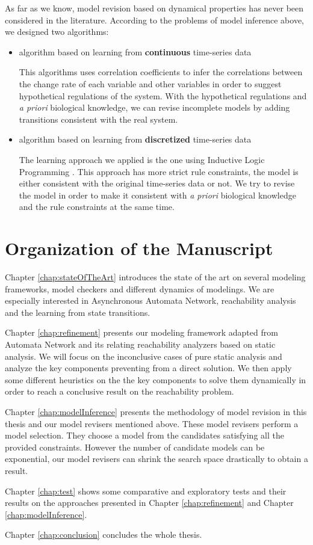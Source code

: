 As far as we know, model revision based on dynamical properties has never been considered in the literature.
According to the problems of model inference above, we designed two algorithms:
\begin{itemize}
    \item algorithm based on learning from \textbf{continuous} time-series data
    
    This algorithms uses correlation coefficients to infer the correlations between the change rate of each variable and other variables in order to suggest hypothetical regulations of the system.
    With the hypothetical regulations and \textit{a priori} biological knowledge, we can revise incomplete models by adding transitions consistent with the real system.
    \item algorithm based on learning from \textbf{discretized} time-series data
    
    The learning approach we applied is the one using Inductive Logic Programming \cite{ribeiro2018learning}.
    This approach has more strict rule constraints, the model is either consistent with the original time-series data or not.
    We try to revise the model in order to make it consistent with \textit{a priori} biological knowledge and the rule constraints at the same time.
\end{itemize}


\section{Organization of the Manuscript}
Chapter \ref{chap:stateOfTheArt} introduces the state of the art on several modeling frameworks, model checkers and different dynamics of modelings.
We are especially interested in Asynchronous Automata Network, reachability analysis and the learning from state transitions.

Chapter \ref{chap:refinement} presents our modeling framework adapted from Automata Network and its relating reachability analyzers based on static analysis.
We will focus on the inconclusive cases of pure static analysis and analyze the key components preventing from a direct solution.
We then apply some different heuristics on the the key components to solve them dynamically in order to reach a conclusive result on the reachability problem.

Chapter \ref{chap:modelInference} presents the methodology of model revision in this thesis and our model revisers mentioned above.
These model revisers perform a model selection. 
They choose a model from the candidates satisfying all the provided constraints.
However the number of candidate models can be exponential, our model revisers can shrink the search space drastically to obtain a result.

Chapter \ref{chap:test} shows some comparative and exploratory tests and their results on the approaches presented in Chapter \ref{chap:refinement} and Chapter \ref{chap:modelInference}.

Chapter \ref{chap:conclusion} concludes the whole thesis.